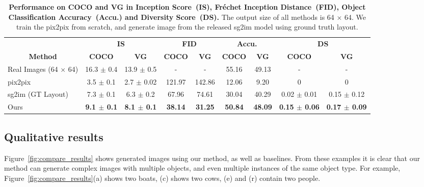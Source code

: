 \documentclass[10pt,twocolumn,letterpaper]{article}
\begin{document}
\begin{table*}[!th]
\centering
\begin{tabular}{l|cc|cc|cc|cc}
                                     & \multicolumn{2}{c|}{\textbf{IS}} & \multicolumn{2}{c|}{\textbf{FID}}         & \multicolumn{2}{c|}{\textbf{Accu.}} & \multicolumn{2}{c}{\textbf{DS}}             \\
\multicolumn{1}{c|}{\textbf{Method}} & \textbf{COCO}          & \textbf{VG}            & \textbf{COCO}      & \textbf{VG}       & \textbf{COCO}            & \textbf{VG}  & \textbf{COCO}            & \textbf{VG}            \\ \hline
Real Images (64 $\times$ 64)         & 16.3 $\pm$ 0.4         & 13.9 $\pm$ 0.5   & - & -     & 55.16              & 49.13             & -                        & -                        \\ \hline
pix2pix~\cite{isola2017image}                              & 3.5 $\pm$ 0.1          & 2.7 $\pm$ 0.02  & 121.97 & 142.86  & 12.06              & 9.20              & 0          & 0 \\
sg2im (GT Layout)~\cite{Johnson2018}                    & 7.3 $\pm$ 0.1          & 6.3 $\pm$ 0.2   & 67.96 & 74.61   & 30.04              & 40.29             & 0.02 $\pm$ 0.01          & 0.15 $\pm$ 0.12          \\ \hline
Ours                                 & \textbf{9.1 $\pm$ 0.1} & \textbf{8.1 $\pm$ 0.1} & \textbf{38.14} & \textbf{31.25} & \textbf{50.84}     & \textbf{48.09}    & \textbf{0.15 $\pm$ 0.06} & \textbf{0.17 $\pm$ 0.09}         
\end{tabular}
\vspace{0.1in}
\caption{\textbf{Performance on COCO and VG in Inception Score~(IS), Fr\'echet Inception Distance~(FID), Object Classification Accuracy~(Accu.) and Diversity Score~(DS).} The output size of all methods is 64 $\times$ 64. We train the pix2pix from scratch, and generate image from the released sg2im model using ground truth layout.}
\vspace{-0.2in}
\label{tb:quantitative_results}
\end{table*}

\subsection{Qualitative results}
Figure~\ref{fig:compare_results} shows generated images using our method, as well as baselines. From these examples it is clear that our method can generate complex images with multiple objects, and even multiple instances of the same object type. For example, Figure~\ref{fig:compare_results}(a) shows two boats, (c) shows two cows, (e) and (r) contain two people.
\end{document}
